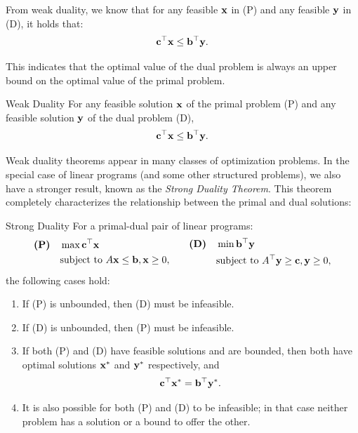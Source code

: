 From weak duality, we know that for any feasible $\mathbf{x}$ in (P) and any feasible $\mathbf{y}$ in (D), it holds that:
\[
\mathbf{c}^\top \mathbf{x} \leq \mathbf{b}^\top \mathbf{y}.
\]

This indicates that the optimal value of the dual problem is always an upper bound on the optimal value of the primal problem.

\begin{theorem}{Weak Duality}\label{thm:weak-duality}
For any feasible solution $\mathbf{x}$ of the primal problem (P) and any feasible solution $\mathbf{y}$ of the dual problem (D), 
\[
\mathbf{c}^\top \mathbf{x} \leq \mathbf{b}^\top \mathbf{y}.
\]
\end{theorem}

Weak duality theorems appear in many classes of optimization problems. In the special case of linear programs (and some other structured problems), we also have a stronger result, known as the \emph{Strong Duality Theorem}. This theorem completely characterizes the relationship between the primal and dual solutions:

\begin{theorem}{Strong Duality}\label{thm:strong-duality}
For a primal-dual pair of linear programs:
\[
\begin{aligned}
\textbf{(P)} \quad &\max \mathbf{c}^\top \mathbf{x} \\
&\text{subject to } A \mathbf{x} \leq \mathbf{b}, \mathbf{x} \geq 0,
\end{aligned}
\quad\quad
\begin{aligned}
\textbf{(D)} \quad &\min \mathbf{b}^\top \mathbf{y} \\
&\text{subject to } A^\top \mathbf{y} \geq \mathbf{c}, \mathbf{y} \geq 0,
\end{aligned}
\]
the following cases hold:
\begin{enumerate}
\item  If (P) is unbounded, then (D) must be infeasible.
\item  If (D) is unbounded, then (P) must be infeasible.
\item  If both (P) and (D) have feasible solutions and are bounded, then both have optimal solutions $\mathbf{x}^*$ and $\mathbf{y}^*$ respectively, and 
\[
\mathbf{c}^\top \mathbf{x}^* = \mathbf{b}^\top \mathbf{y}^*.
\]
\item  It is also possible for both (P) and (D) to be infeasible; in that case neither problem has a solution or a bound to offer the other.
\end{enumerate}
\end{theorem}

